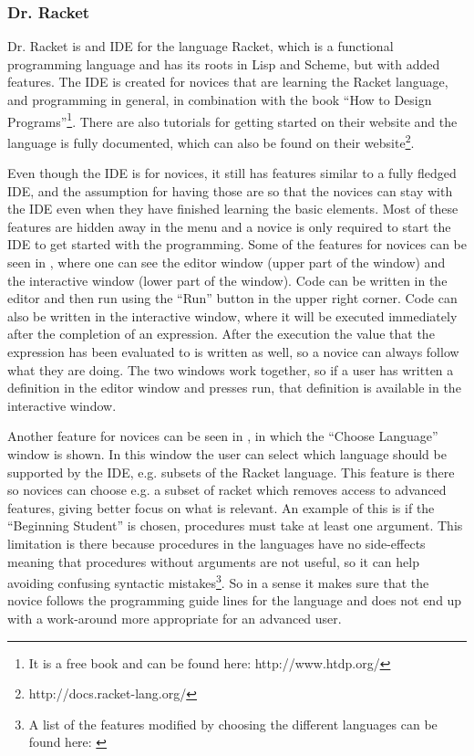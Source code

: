 \subsubsection{Dr. Racket}
Dr. Racket is and IDE for the language Racket, which is a functional programming language and has its roots in Lisp and Scheme, but with added features. The IDE is created for novices that are learning the Racket language, and programming in general, in combination with the book ``How to Design Programs''\footnote{It is a free book and can be found here: http://www.htdp.org/}. There are also tutorials for getting started on their website and the language is fully documented, which can also be found on their website\footnote{http://docs.racket-lang.org/}.

Even though the IDE is for novices, it still has features similar to a fully fledged IDE, and the assumption for having those are so that the novices can stay with the IDE even when they have finished learning the basic elements. Most of these features are hidden away in the menu and a novice is only required to start the IDE to get started with the programming. Some of the features for novices can be seen in , where one can see the editor window (upper part of the window) and the interactive window (lower part of the window). Code can be written in the editor and then run using the ``Run'' button in the upper right corner. Code can also be written in the interactive window, where it will be executed immediately after the completion of an expression. After the execution the value that the expression has been evaluated to is written as well, so a novice can always follow what they are doing. The two windows work together, so if a user has written a definition in the editor window and presses run, that definition is available in the interactive window.

Another feature for novices can be seen in , in which the ``Choose Language'' window is shown. In this window the user can select which language should be supported by the IDE, e.g. subsets of the Racket language. This feature is there so novices can choose e.g. a subset of racket which removes access to advanced features, giving better focus on what is relevant. An example of this is if the ``Beginning Student'' is chosen, procedures must take at least one argument. This limitation is there because procedures in the languages have no side-effects meaning that procedures without arguments are not useful, so it can help avoiding confusing syntactic mistakes\cite{dr_racket_languages}\footnote{A list of the features modified by choosing the different languages can be found here: \cite{dr_racket_languages}}. So in a sense it makes sure that the novice follows the programming guide lines for the language and does not end up with a work-around more appropriate for an advanced user.


